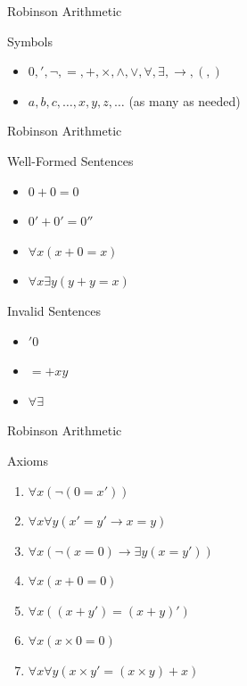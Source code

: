 \documentclass{beamer}
\begin{document}
\begin{frame}{Robinson Arithmetic}
  \begin{block}{Symbols}
    \begin{itemize}
    \item[] $0, ', \neg, =, +, \times, \land, \lor, \forall, \exists, \rightarrow, (, )$
    \item[] $a, b, c, \dots, x, y, z, \dots$ (as many as needed)
    \end{itemize}
  \end{block}
\end{frame}

\begin{frame}{Robinson Arithmetic}
  \begin{block}{Well-Formed Sentences}
    \begin{itemize}
    \item[] $0 + 0 = 0$
    \item[] $0' + 0' = 0''$
    \item[] $\forall x(x + 0 = x)$
    \item[] $\forall x \exists y(y + y = x)$
    \end{itemize}
  \end{block}
  \begin{block}{Invalid Sentences}
    \begin{itemize}
    \item[] $'0$
    \item[] $= +xy$
    \item[] $\forall \exists$
    \end{itemize}
  \end{block}
\end{frame}

\begin{frame}{Robinson Arithmetic}
  \begin{block}{Axioms}
    \begin{enumerate}
    \item<1-> $\forall x (\neg (0 = x'))$
    \item<2-> $\forall x \forall y (x' = y' \rightarrow x = y)$
    \item<3-> $\forall x (\neg (x = 0) \rightarrow \exists y (x = y'))$
    \item<4-> $\forall x (x + 0 = 0)$
    \item<5-> $\forall x ((x + y') = (x + y)')$
    \item<6-> $\forall x (x \times 0 = 0)$
    \item<7-> $\forall x \forall y (x \times y' = (x \times y) + x)$
    \end{enumerate}
  \end{block}
\end{frame}
\end{document}
